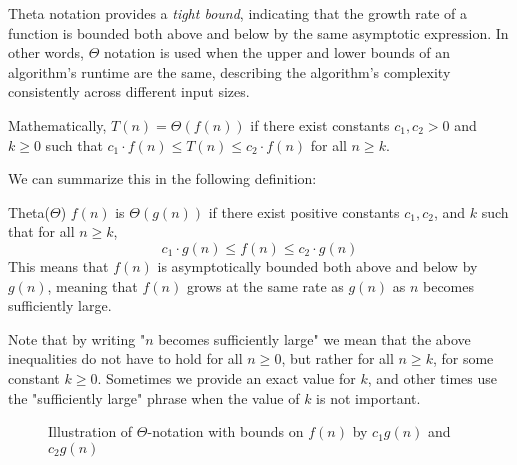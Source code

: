 Theta notation provides a \textit{tight bound}, indicating that the growth rate of a function is bounded both above and below by the same asymptotic expression. In other words, $\Theta$ notation is used when the upper and lower bounds of an algorithm’s runtime are the same, describing the algorithm’s complexity consistently across different input sizes.

Mathematically, $T(n) = \Theta(f(n))$ if there exist constants $c_1, c_2 > 0$ and $k \geq 0$ such that $c_1 \cdot f(n) \leq T(n) \leq c_2 \cdot f(n)$ for all $n \geq k$.

We can summarize this in the following definition:

\begin{definition}{Theta(\(\Theta\))}
    $f(n)$ is $\Theta(g(n))$ if there exist positive constants $c_1, c_2$, and $k$ such that for all $n \geq k$,
    \medskip
    \[
    c_1 \cdot g(n) \leq f(n) \leq c_2 \cdot g(n)
    \]
    \medskip
This means that $f(n)$ is asymptotically bounded both above and below by $g(n)$, meaning that $f(n)$ grows at the same rate as $g(n)$ as $n$ becomes sufficiently large.
\label{def:theta_notation}
\end{definition}

Note that by writing "$n$ becomes sufficiently large" we mean that the above inequalities do not have to hold for all $n \geq 0$, but rather for all $n \geq k$, for some constant $k \geq 0$. Sometimes we provide an exact value for $k$, and other times use the "sufficiently large" phrase when the value of $k$ is not important.

\begin{figure}[htbp]
    \centering
    \caption{Illustration of \(\Theta\)-notation with bounds on \( f(n) \) by \( c_1 g(n) \) and \( c_2 g(n) \)}
    \label{fig:theta_notation}
\end{figure}

